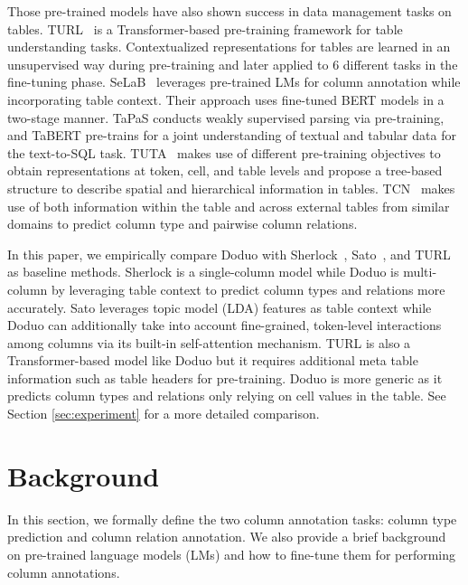 \documentclass[sigconf]{acmart}
\newcommand{\name}{\mbox{\sc Doduo}}
\newcommand{\rev}[1]{#1}
\begin{document}
Those pre-trained models have also shown success in data management tasks on tables.
TURL~\cite{Deng:2020:TURL} is a Transformer-based pre-training framework for table understanding tasks. Contextualized representations for tables are learned in an unsupervised way during pre-training and later applied to 6 different tasks in the fine-tuning phase. 
%
SeLaB~\cite{Trabelsi:2020:SeLaB} leverages pre-trained LMs for column annotation while incorporating table context. Their approach uses fine-tuned BERT models in a two-stage manner.
%
TaPaS\cite{herzig2020tapas} conducts weakly supervised parsing via pre-training, and TaBERT\cite{yin2020tabert} pre-trains for a joint understanding of textual and tabular data \rev{for the text-to-SQL task.}
%
TUTA~\cite{Wang2:020:StructureAwarePretraining4Table} makes use of different pre-training objectives to obtain representations at token, cell, and table levels and propose a tree-based structure to describe spatial and hierarchical information in tables. 
%
TCN~\cite{Wang:2021:TCN} makes use of both information within the table 
and \rev{across external tables from similar domains} to predict column type and pairwise column relations. 


\rev{
In this paper, we empirically compare \name{} with Sherlock~\cite{Hulsebos:2019:Sherlock}, Sato~\cite{Zhang:2020:Sato}, and TURL~\cite{Deng:2020:TURL} as baseline methods. 
Sherlock is a single-column model while \name{} is multi-column by
leveraging table context to predict column
types and relations more accurately. 
Sato leverages topic model (LDA) features
as table context while \name{} can additionally take into account
fine-grained, token-level interactions among columns via its built-in self-attention 
mechanism. 
TURL is also a Transformer-based model like \name{} but it requires
additional meta table information such as table headers for pre-training. \name{} is more generic as it predicts column types and relations only relying on cell values in the table. See Section \ref{sec:experiment} for a more detailed comparison. }

\section{Background}\label{sec:background}
In this section, we formally define the two column annotation tasks: column type prediction and column relation annotation.
We also provide a brief background on pre-trained language models (LMs) and how to fine-tune them for performing column annotations.
\end{document}
